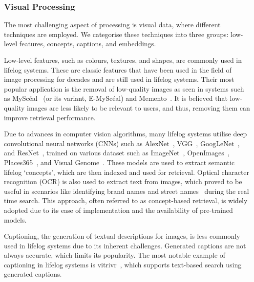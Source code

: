 \documentclass[11pt]{article}
\newcommand{\mysceal}{MySc{\'e}al}
\begin{document}
\subsubsection{Visual Processing}
The most challenging aspect of processing is visual data, where different techniques are employed. We categorise these techniques into three groups: low-level features, concepts, captions, and embeddings.

Low-level features, such as colours, textures, and shapes, are commonly used in lifelog systems. These are classic features that have been used in the field of image processing for decades and are still used in lifelog systems. Their most popular application is the removal of low-quality images as seen in systems such as \mysceal~\cite{emysceal2022} (or its variant, E-\mysceal) and Memento~\cite{alam2023memento}. It is believed that low-quality images are less likely to be relevant to users, and thus, removing them can improve retrieval performance.

Due to  advances in computer vision algorithms, many lifelog systems utilise deep convolutional neural networks (CNNs) such as AlexNet~\cite{krizhevsky2012imagenet}, VGG~\cite{vgg}, GoogLeNet~\cite{szegedy2015going}, and ResNet~\cite{resnet}, trained on various dataset such as ImageNet~\cite{deng2009imagenet}, OpenImages~\cite{kuznetsova2020open}, Places365~\cite{zhou2014learning}, and Visual Genome~\cite{krishna_visual_2016}. These models are used to extract semantic lifelog `concepts', which are then indexed and used for retrieval. Optical character recognition (OCR) is also used to extract text from images, which proved to be useful in scenarios like identifying brand names and street names~\cite{tran2023comparing} during the real time search. This approach, often referred to as concept-based retrieval, is widely adopted due to its ease of implementation and the availability of pre-trained models.

Captioning, the generation of textual descriptions for images, is less commonly used in lifelog systems due to its inherent challenges. Generated captions are not always accurate, which limits its popularity. The most notable example of captioning in lifelog systems is vitrivr~\cite{spiess2023best}, which supports text-based search using generated captions. 
\end{document}
